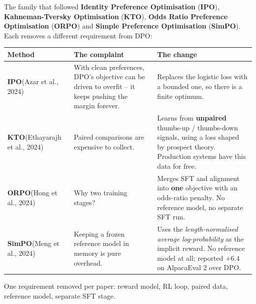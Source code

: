 \documentclass[aspectratio=169]{beamer}
\begin{document}
\begin{frame}{The family that followed}
  \footnotesize
  \textbf{Identity Preference Optimisation} (\textbf{IPO}), \textbf{Kahneman-Tversky
  Optimisation} (\textbf{KTO}), \textbf{Odds Ratio Preference Optimisation} (\textbf{ORPO})
  and \textbf{Simple Preference Optimisation} (\textbf{SimPO}). Each removes a different
  requirement from DPO:

  \vskip 6pt
  \begin{center}
  \begin{tabular}{p{1.7cm} p{4.4cm} p{6.2cm}}
    \toprule
    \textbf{Method} & \textbf{The complaint} & \textbf{The change} \\
    \midrule
    \textbf{IPO}\newline (Azar et al., 2024) &
      With clean preferences, DPO's objective can be driven to overfit -- it keeps pushing the
      margin forever. &
      Replaces the logistic loss with a bounded one, so there is a finite optimum. \\[5pt]
    \textbf{KTO}\newline (Ethayarajh et al., 2024) &
      Paired comparisons are expensive to collect. &
      Learns from \textbf{unpaired} thumbs-up / thumbs-down signals, using a loss shaped by
      prospect theory. Production systems have this data for free. \\[5pt]
    \textbf{ORPO}\newline (Hong et al., 2024) &
      Why two training stages? &
      Merges SFT and alignment into \textbf{one} objective with an odds-ratio penalty. No
      reference model, no separate SFT run. \\[5pt]
    \textbf{SimPO}\newline (Meng et al., 2024) &
      Keeping a frozen reference model in memory is pure overhead. &
      Uses the \emph{length-normalised average log-probability} as the implicit reward. No
      reference model at all; reported $+6.4$ on AlpacaEval 2 over DPO. \\
    \bottomrule
  \end{tabular}
  \end{center}

  \vskip 4pt
  \begin{center}
    \scriptsize
    One requirement removed per paper: reward model, RL loop, paired data, reference model,
    separate SFT stage.
  \end{center}
\end{frame}
\end{document}
